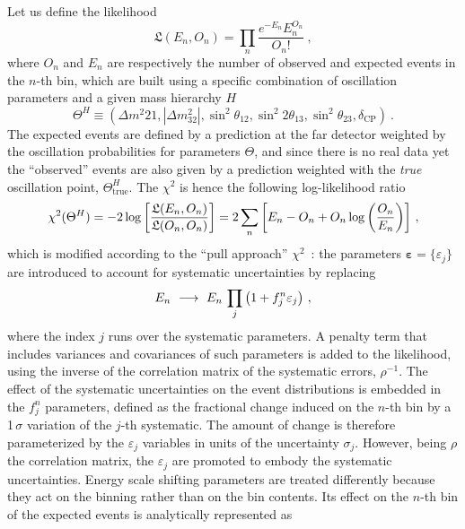 \documentclass[a4paper, 11pt]{article}
\newcommand{\bs}{\boldsymbol}
\begin{document}
Let us define the likelihood
\begin{equation}
	\mathfrak{L}(E_n, O_n) = \prod_n \frac{e^{-E_n} E_n^{O_n}}{O_n!}\ ,
\end{equation}
where $O_n$ and $E_n$ are respectively the number of observed and expected events in the $n$-th bin, %
which are built using a specific combination of oscillation parameters and a given mass hierarchy $H$
\begin{equation}
	\Theta^H \equiv (\Delta m^2{21}, |\Delta m^2_{32}|, \sin^2\theta_{12}, \sin^2 2\theta_{13}, \sin^2 \theta_{23}, \delta_\text{CP})\ .
\end{equation}
The expected events are defined by a prediction at the far detector weighted by the oscillation probabilities %
for parameters $\Theta$, and since there is no real data yet the ``observed'' events are also given by %
a prediction weighted with the \emph{true} oscillation point, $\Theta^H_\text{true}$.
The $\chi^2$ is hence the following log-likelihood ratio
\begin{equation}
	\label{eq:log_ratio}
	\chi^2(\Theta^H) = -2 \log \qty[\frac{\mathfrak{L}(E_n, O_n)}{\mathfrak{L}(O_n, O_n)}] =
		2 \sum_n \qty[E_n - O_n + O_n \log \qty(\frac{O_n}{E_n})]\ ,
\end{equation}
which is modified according to the ``pull approach'' $\chi^2$~\cite{Fogli:2002pt}: %
the parameters $\bs{\varepsilon} = \{\varepsilon_j\}$ are introduced %
to account for systematic uncertainties by replacing
\begin{equation}
	\label{eq:pull}
	E_n\ \longrightarrow\ E_n\,\prod_j \qty(1 + f_j^n \varepsilon_j)\ ,
\end{equation}
where the index $j$ runs over the systematic parameters.
A penalty term that includes variances and covariances of such parameters is added to the likelihood, %
using the inverse of the correlation matrix of the systematic errors, $\rho^{-1}$.
The effect of the systematic uncertainties on the event distributions is embedded in the $f_j^n$ parameters, %
defined as the fractional change induced on the $n$-th bin by a 1\,$\sigma$ variation of the $j$-th systematic.
The amount of change is therefore parameterized by the $\varepsilon_j$ variables in units of the uncertainty $\sigma_j$.
However, being $\rho$ the correlation matrix, the $\varepsilon_j$ are promoted to embody the systematic uncertainties.
Energy scale shifting parameters are treated differently because they act on the binning rather than on the %
bin contents.
Its effect on the $n$-th bin of the expected events is analytically represented as
\end{document}
